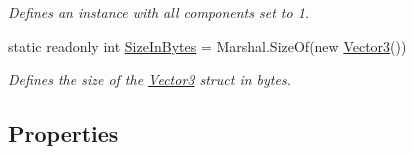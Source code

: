 \begin{DoxyCompactItemize}
\begin{DoxyCompactList}\small\item\em Defines an instance with all components set to 1. \end{DoxyCompactList}\item 
static readonly int \hyperlink{struct_open_t_k_1_1_vector3_ae7cbee02af524095ee72226d842c6892}{Size\-In\-Bytes} = Marshal.\-Size\-Of(new \hyperlink{struct_open_t_k_1_1_vector3}{Vector3}())
\begin{DoxyCompactList}\small\item\em Defines the size of the \hyperlink{struct_open_t_k_1_1_vector3}{Vector3} struct in bytes. \end{DoxyCompactList}\end{DoxyCompactItemize}
\subsection*{Properties}
